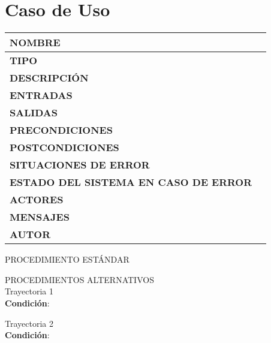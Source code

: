 \section{Caso de Uso }
\begin{longtable}{ | p{6cm} | p{10cm} |}
\hline
\textbf{NOMBRE} & \\
\hline
\textbf{TIPO} & \\
\hline
\textbf{DESCRIPCIÓN} & \\
\hline
\textbf{ENTRADAS} & \\
\hline
\textbf{SALIDAS} & \\
\hline
\textbf{PRECONDICIONES} & \\
\hline
\textbf{POSTCONDICIONES} & \\
\hline
\textbf{SITUACIONES DE ERROR} & \\
\hline
\textbf{ESTADO DEL SISTEMA EN CASO DE ERROR} & \\
\hline
\textbf{ACTORES} & \\
\hline
\textbf{MENSAJES} & \\
\hline
\textbf{AUTOR} & \\
\hline
\end{longtable}
\vspace*{1cm}
\noindent
\Large{PROCEDIMIENTO ESTÁNDAR}
\large{}
\begin{enumerate}
\end{enumerate}
\vspace*{1cm}
\Large{PROCEDIMIENTOS ALTERNATIVOS}\\
\large{Trayectoria 1}\\
\textbf{Condición}:
\begin{enumerate}
\end{enumerate}
\large{Trayectoria 2}\\
\textbf{Condición}:
\begin{enumerate}
\end{enumerate}